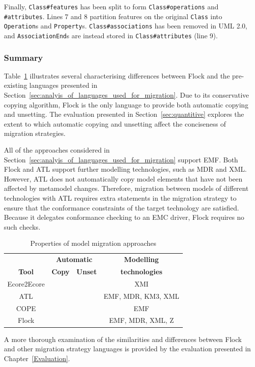 Finally, \texttt{C\-la\-ss\#fe\-at\-ur\-es} has been split to form \texttt{C\-la\-ss\#op\-er\-at\-io\-ns} and \texttt{\#at\-tr\-ib\-ut\-es}. Lines 7 and 8 partition features on the original \texttt{Cl\-a\-ss} into \texttt{Op\-er\-at\-io\-n}s and \texttt{Pr\-op\-er\-ty}s. \texttt{Cl\-as\-s\#a\-ss\-oc\-ia\-ti\-on\-s} has been removed in UML 2.0, and \texttt{As\-so\-ci\-at\-i\-onEn\-d}s are instead stored in \texttt{Cl\-a\-ss\#at\-tr\-ib\-ut\-es} (line 9).


\subsubsection{Summary}
Table~\ref{tab:differences} illustrates several characterising differences between Flock and the pre-existing languages presented in Section~\ref{sec:analyis_of_languages_used_for_migration}. Due to its conservative copying algorithm, Flock is the only language to provide both automatic copying and unsetting. The evaluation presented in Section~\ref{sec:quantitive} explores the extent to which automatic copying and unsetting affect the conciseness of migration strategies.

All of the approaches considered in Section~\ref{sec:analyis_of_languages_used_for_migration} support EMF. Both Flock and ATL support further modelling technologies, such as MDR and XML. However, ATL does not automatically copy model elements that have not been affected by metamodel changes. Therefore, migration between models of different technologies with ATL requires extra statements in the migration strategy to ensure that the conformance constraints of the target technology are satisfied. Because it delegates conformance checking to an EMC driver, Flock requires no such checks.

\begin{table}[b]
	\centering
	\begin{tabular}{|c|c|c|c|}
		\hline
		             & \multicolumn{2}{c|}{\textbf{Automatic}} & \textbf{Modelling} \\
		\textbf{Tool}& \textbf{Copy} & \textbf{Unset}          & \textbf{technologies} \\
		\hline
		Ecore2Ecore  & \tick             & \cross              & XMI                    \\
		\hline
		ATL          & \cross            & \tick               & EMF, MDR, KM3, XML     \\
		\hline
		COPE         & \tick             & \cross              & EMF                    \\
		\hline
		Flock        & \tick             & \tick               & EMF, MDR, XML, Z       \\
		\hline
	\end{tabular}
	\label{tab:differences}
	\caption{Properties of model migration approaches}
\end{table}

A more thorough examination of the similarities and differences between Flock and other migration strategy languages is provided by the evaluation presented in Chapter~\ref{Evaluation}.
